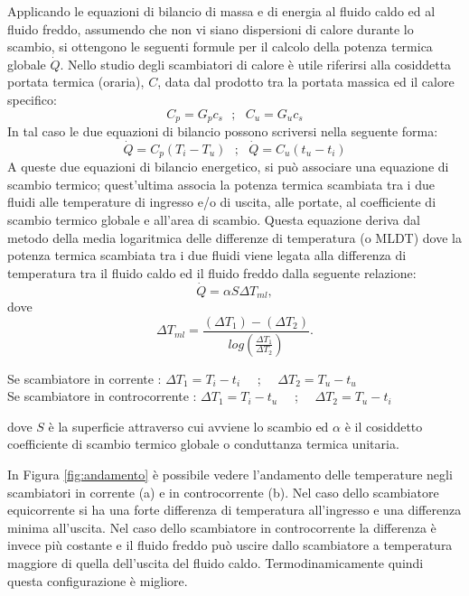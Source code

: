 \documentclass[laurea,oneside,11pt]{USiena_tesiLM}
\begin{document}
Applicando le equazioni di bilancio di massa e di energia al fluido caldo ed al fluido freddo, assumendo che non vi siano dispersioni di calore durante lo scambio, si ottengono le seguenti formule per il calcolo della potenza termica globale $\dot{Q}$. Nello studio degli scambiatori di calore è  utile riferirsi alla cosiddetta portata termica (oraria), $C$, data dal prodotto tra la portata massica ed il calore specifico:
\begin{equation}
C_p=G_p c_s  \ \ \ ; \ \ \ C_u=G_u c_s
\end{equation}
In tal caso le due equazioni di bilancio  possono scriversi nella seguente forma:
\begin{equation}
\dot{Q}=C_p(T_i - T_u) \ \ \ ; \ \ \ \dot{Q}=C_u(t_u - t_i)
\label{eq:scambiatore1}
\end{equation}
A queste due equazioni di bilancio energetico, si può associare una equazione di scambio termico; quest'ultima associa la potenza termica scambiata tra i due fluidi alle temperature di ingresso e/o di uscita, alle portate, al coefficiente di scambio termico globale e all'area di scambio. Questa equazione deriva dal metodo della media logaritmica delle differenze di temperatura (o MLDT) dove  la potenza termica scambiata tra i due fluidi viene legata alla differenza di temperatura tra il fluido caldo ed il fluido freddo dalla seguente relazione:
\begin{equation}
\dot{Q}=\alpha S \Delta T_{ml} ,
\end{equation}
dove
\begin{equation}
 \Delta T_{ml} = \frac{(\Delta T_1)-(\Delta T_2)}{log\left( \frac{\Delta T_1}{\Delta T_2} \right)}.
 \label{eq:scambiatore2}
 \end{equation}
 \begin{center}
 Se scambiatore in corrente : $ \Delta T_1 = T_i - t_i $  \ \ ; \ \ $ \Delta T_2 = T_u - t_u $  \\
 
 Se scambiatore in controcorrente : $ \Delta T_1 = T_i - t_u $  \ \ ; \ \ $ \Delta T_2 = T_u - t_i $ 
\end{center}
dove $S$ \`e  la superficie attraverso cui avviene lo scambio ed $\alpha$ \`e  il cosiddetto coefficiente di scambio termico globale o conduttanza termica unitaria. 

In Figura \ref{fig:andamento} è  possibile vedere l'andamento delle temperature negli scambiatori in corrente (a) e in controcorrente (b).
Nel caso dello scambiatore equicorrente si ha una forte differenza di temperatura all'ingresso e una differenza  minima  all'uscita.  Nel  caso  dello  scambiatore in controcorrente  la  differenza  è invece più costante e il fluido freddo può uscire dallo scambiatore a temperatura maggiore di  quella  dell'uscita del fluido  caldo. 
Termodinamicamente quindi  questa  configurazione  è migliore. 
\end{document}
